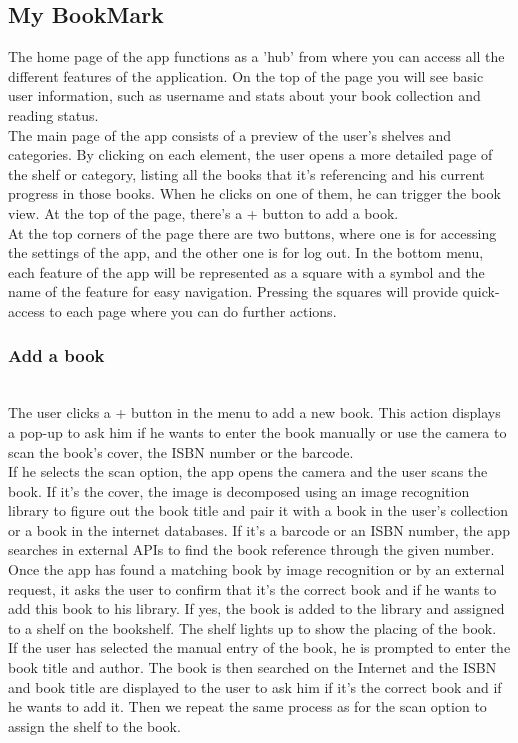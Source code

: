 \documentclass[conference]{IEEEtran}
\begin{document}
\subsection{My BookMark}
The home page of the app functions as a 'hub' from where you can access all the different features of the application. On the top of the page you will see basic user information, such as username and stats about your book collection and reading status.\\
The main page of the app consists of a preview of the user's shelves and categories. By clicking on each element, the user opens a more detailed page of the shelf or category, listing all the books that it's referencing and his current progress in those books. When he clicks on one of them, he can trigger the book view. At the top of the page, there's a + button to add a book.\\
At the top corners of the page there are two buttons, where one is for accessing the settings of the app, and the other one is for log out. In the bottom menu, each feature of the app will be represented as a square with a symbol and the name of the feature for easy navigation. Pressing the squares will provide quick-access to each page where you can do further actions. \\

\subsubsection{Add a book}\hfill\\
The user clicks a + button in the menu to add a new book. This action displays a pop-up to ask him if he wants to enter the book manually or use the camera to scan the book's cover, the ISBN number or the barcode.\\
If he selects the scan option, the app opens the camera and the user scans the book. If it's the cover, the image is decomposed using an image recognition library to figure out the book title and pair it with a book in the user's collection or a book in the internet databases. If it's a barcode or an ISBN number, the app searches in external APIs to find the book reference through the given number. Once the app has found a matching book by image recognition or by an external request, it asks the user to confirm that it's the correct book and if he wants to add this book to his library. If yes, the book is added to the library and assigned to a shelf on the bookshelf. The shelf lights up to show the placing of the book.\\
If the user has selected the manual entry of the book, he is prompted to enter the book title and author. The book is then searched on the Internet and the ISBN and book title are displayed to the user to ask him if it's the correct book and if he wants to add it. Then we repeat the same process as for the scan option to assign the shelf to the book.\\
\end{document}
